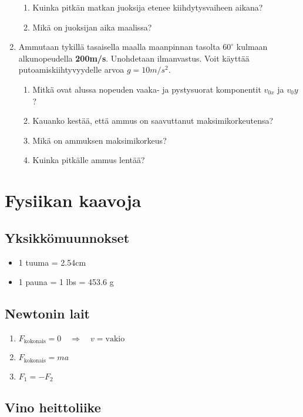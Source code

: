 \documentclass[12pt]{article}
\begin{document}
\begin{enumerate}
\begin{enumerate}
\item Kuinka pitkän matkan juoksija etenee kiihdytysvaiheen aikana?
\item Mikä on juoksijan aika maalissa?
\end{enumerate}
\item Ammutaan tykillä tasaisella maalla maanpinnan tasolta $60^\circ$
kulmaan alkunopeudella \textbf{200m/s}. Unohdetaan ilmanvastus. Voit käyttää putoamiskiihtyvyydelle arvoa $g=10m/s^2$.
\begin{enumerate}
\item Mitkä ovat alussa nopeuden vaaka- ja pystysuorat komponentit $v_{0x}$ ja $v_0y$?
\item Kauanko kestää, että ammus on saavuttanut maksimikorkeutensa?
\item Mikä on ammuksen maksimikorkeus?
\item Kuinka pitkälle ammus lentää?
\end{enumerate}
\end{enumerate}

\newpage
\section{Fysiikan kaavoja}

\subsection*{Yksikkömuunnokset}
\begin{itemize}
\item 1 tuuma = 2.54cm
\item 1 pauna = 1 lbs = 453.6 g
\end{itemize}

\subsection*{Newtonin lait}
\begin{enumerate}
\item $F_{\textrm{kokonais}}=0 \quad\Rightarrow\quad v=\textrm{vakio}$
\item $F_{\textrm{kokonais}}=ma$
\item $F_1=-F_2$
\end{enumerate}

\subsection*{Vino heittoliike}
\end{document}
